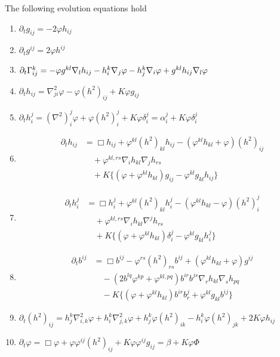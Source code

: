 \documentclass{amsart}
\begin{document}
\begin{lemma}
\label{lem:evolution}
The following evolution equations hold
\begin{enumerate}
\item \label{eq:delt_metric} $\partial_tg_{ij} = -2\varphi h_{ij}$
\item \label{eq:delt_inversemetric} $\partial_t g^{ij} = 2\varphi h^{ij}$
\item \label{eq:delt_christoffel} $\partial_t {\Gamma}^{k}_{ij} = -\varphi g^{kl} \nabla_l h_{ij} - h^k_i \nabla_j \varphi - h^k_j \nabla_i \varphi + g^{kl} h_{ij} \nabla_l \varphi$
\item \label{eq:delt_sff} $\partial_t h_{ij} = \nabla^2_{ji} \varphi - \varphi(h^2)_{ij} + K \varphi g_{ij}$
\item \label{eq:delt_weingarten} $\partial_t h_i^j = (\nabla^2)^j_i\varphi + \varphi(h^2)_i^j + K \varphi\delta_i^j = \alpha^j_i + K \varphi\delta_i^j$
\item \label{eq:delt_sff_box} \begin{align*}
\partial_t h_{ij} &= \Box h_{ij} + \varphi^{kl} (h^2)_{kl} h_{ij} - (\varphi^{kl}h_{kl} + \varphi) (h^2)_{ij} \\
& \quad + \varphi^{kl,rs}\nabla_i h_{kl}\nabla_j h_{rs} \\
& \quad + K \{(\varphi + \varphi^{kl}h_{kl}) g_{ij} - \varphi^{kl}g_{kl}h_{ij}\}
\end{align*}
\item \label{eq:delt_weingarten_box} \begin{align*}
\partial_t h_i^j &= \Box h_i^j + \varphi^{kl} (h^2)_{kl} h_i^j - (\varphi^{kl}h_{kl} - \varphi) (h^2)_i^j \\
& \quad + \varphi^{kl,rs}\nabla_i h_{kl}\nabla^j h_{rs} \\
& \quad + K \{(\varphi + \varphi^{kl}h_{kl}) \delta_i^j - \varphi^{kl}g_{kl}h_i^j\}
\end{align*}
\item \label{eq:delt_inversesff} \begin{align*}
\partial_t b^{ij} &= \Box b^{ij} - \varphi^{rs} (h^2)_{rs} b^{ij} + (\varphi^{kl}h_{kl} + \varphi) g^{ij} \\  
& \quad - \left(2b^{lq}\varphi^{kp} + \varphi^{kl,pq}\right) b^{ir}b^{js} \nabla_r h_{kl} \nabla_s h_{pq} \\
& \quad - K \{(\varphi + \varphi^{kl}h_{kl}) b^{ir}b^{j}_{r} + \varphi^{kl}g_{kl}b^{ij}\}
\end{align*}
\item \label{eq:delt_squaredsff} $\partial_t (h^2)_{ij} = h^k_j \nabla^2_{i,k} \varphi + h^k_i \nabla^2_{j,k} \varphi + h^k_j \varphi(h^2)_{ik} - h^k_i \varphi(h^2)_{jk} + 2K\varphi h_{ij}$
\item \label{eq:delt_speed} $\partial_t \varphi = \Box \varphi + \varphi\varphi^{ij}(h^2)_{ij} + K \varphi\varphi^{ij}g_{ij} = \beta + K\varphi\Phi$
\end{enumerate}
\end{lemma}
\end{document}
